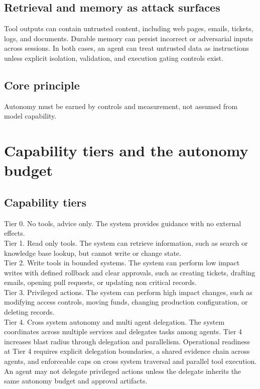 \documentclass[11pt]{article}
\begin{document}
\subsection{Retrieval and memory as attack surfaces}
Tool outputs can contain untrusted content, including web pages, emails, tickets, logs, and documents. Durable memory can persist incorrect or adversarial inputs across sessions. In both cases, an agent can treat untrusted data as instructions unless explicit isolation, validation, and execution gating controls exist.

\subsection{Core principle}
Autonomy must be earned by controls and measurement, not assumed from model capability.

\section{Capability tiers and the autonomy budget}

\subsection{Capability tiers}
Tier 0. No tools, advice only. The system provides guidance with no external effects.\\
Tier 1. Read only tools. The system can retrieve information, such as search or knowledge base lookup, but cannot write or change state.\\
Tier 2. Write tools in bounded systems. The system can perform low impact writes with defined rollback and clear approvals, such as creating tickets, drafting emails, opening pull requests, or updating non critical records.\\
Tier 3. Privileged actions. The system can perform high impact changes, such as modifying access controls, moving funds, changing production configuration, or deleting records.\\
Tier 4. Cross system autonomy and multi agent delegation. The system coordinates across multiple services and delegates tasks among agents. Tier 4 increases blast radius through delegation and parallelism. Operational readiness at Tier 4 requires explicit delegation boundaries, a shared evidence chain across agents, and enforceable caps on cross system traversal and parallel tool execution. An agent may not delegate privileged actions unless the delegate inherits the same autonomy budget and approval artifacts.
\end{document}
